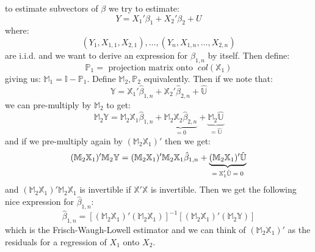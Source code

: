 \documentclass{tufte-book}
\theoremstyle{mytheoremstyle}
\theoremstyle{mylemstyle}
\theoremstyle{mydefstyle}
\begin{document}
 to estimate subvectors of \(\beta\) we try to estimate: 
	\[Y = X_1'\beta_1 + X_2'\beta_2 + U\]
where:
	\[(Y_1, X_{1,1}, X_{2,1}), \dots, (Y_n, X_{1,n}, \dots, X_{2,n})\]
are i.i.d. and we want to derive an expression for \(\hat{\beta}_{1,n}\) by itself. Then define:
	\[\mathbb{P}_1 = \text{ projection matrix onto }\ col(\mathbb{X}_1)\]
giving us: \(\mathbb{M}_1 = \mathbb{I} - \mathbb{P}_1\). Define \(\mathbb{M}_2, \mathbb{P}_2\) equivalently. Then if we note that:
	\[\mathbb{Y} = \mathbb{X}_1'\hat{\beta}_{1,n} + \mathbb{X}_2'\hat{\beta}_{2,n} + \hat{\mathbb{U}}\]
we can pre-multiply by \(\mathbb{M}_2\) to get:
	\[\mathbb{M}_2 \mathbb{Y} = \mathbb{M}_2\mathbb{X}_1 \hat{\beta}_{1,n} + \underbrace{\mathbb{M}_2\mathbb{X}_2 \hat{\beta}_{2,n}}_\textrm{\(=0\)} + \underbrace{\mathbb{M}_2\hat{\mathbb{U}}}_\textrm{\(= \hat{\mathbb{U}}\)}\]
and if we pre-multiply again by \((\mathbb{M}_2\mathbb{X}_1)'\) then we get:
	\[(\mathbb{M}_2\mathbb{X}_1)'\mathbb{M}_2 \mathbb{Y} = (\mathbb{M}_2\mathbb{X}_1)'\mathbb{M}_2\mathbb{X}_1\hat{\beta}_{1,n} + \underbrace{(\mathbb{M}_2\mathbb{X}_1)'\hat{\mathbb{U}}}_\textrm{\( = \mathbb{X}_1'\hat{\mathbb{U}} = 0\)}\]
and \( (\mathbb{M}_2\mathbb{X}_1)'\mathbb{M}_2\mathbb{X}_1\) is invertible if \(\mathbb{X}'\mathbb{X}\) is invertible. Then we get the following nice expression for \(\hat{\beta}_{1,n}\):
	\[\hat{\beta}_{1,n} = \left[(\mathbb{M}_2\mathbb{X}_1)'(\mathbb{M}_2\mathbb{X}_1)\right]^{-1}[(\mathbb{M}_2\mathbb{X}_1)'(\mathbb{M}_2\mathbb{Y})]\]
which is the Frisch-Waugh-Lowell estimator and we can think of \((\mathbb{M}_2\mathbb{X}_1)'\) as the residuals for a regression of \(X_1\) onto \(X_2\). 
\end{document}
